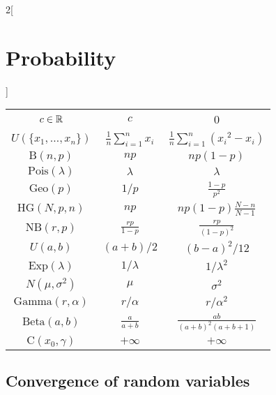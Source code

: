 \documentclass[../../../main.tex]{subfiles}
\begin{document}
\begin{multicols}{2}[\section{Probability}]
\begin{center}
\begin{tabular}{|c|c|c|}
      \hline
      $c\in\mathbb{R}$                & $\displaystyle c$              & 0                                           \\
      $U(\{x_1,\ldots,x_n\})$  & $\frac{1}{n}\sum_{i=1}^n x_i$  & $\frac{1}{n}\sum_{i=1}^n ({x_i}^2-x_i)$     \\
      $\text{B}(n,p)$          & $\displaystyle np$             & $\displaystyle np(1-p)$                     \\
      $\text{Pois}(\lambda)$   & $\displaystyle \lambda$        & $\displaystyle \lambda$                     \\
      $\text{Geo}(p)$          & $\displaystyle 1/p$            & $\displaystyle \frac{1-p}{p^2}$             \\
      $\text{HG}(N,p,n)$       & $\displaystyle np$             & $\displaystyle np(1-p)\frac{N-n}{N-1}$      \\
      $\text{NB}(r,p)$         & $\displaystyle \frac{rp}{1-p}$ & $\displaystyle \frac{rp}{{(1-p)}^2}$        \\
      $U(a,b)$                 & $\displaystyle (a+b)/2$        & $\displaystyle {(b-a)}^2/12$                \\
      $\text{Exp}(\lambda)$    & $\displaystyle 1/\lambda$      & $\displaystyle 1/\lambda^2$                 \\
      $N(\mu,\sigma^2)$        & $\displaystyle \mu$            & $\displaystyle \sigma^2$                    \\
      $\text{Gamma}(r,\alpha)$ & $\displaystyle r/\alpha$       & $\displaystyle r/\alpha^2$                  \\
      $\text{Beta}(a,b)$       & $\displaystyle \frac{a}{a+b}$  & $\displaystyle \frac{ab}{{(a+b)}^2(a+b+1)}$ \\
      $\text{C}(x_0,\gamma)$   & $\displaystyle +\infty$        & $\displaystyle +\infty$                     \\
      \hline
    \end{tabular}
  \end{center}
  \subsection{Convergence of random variables}

\end{multicols}
\end{document}
